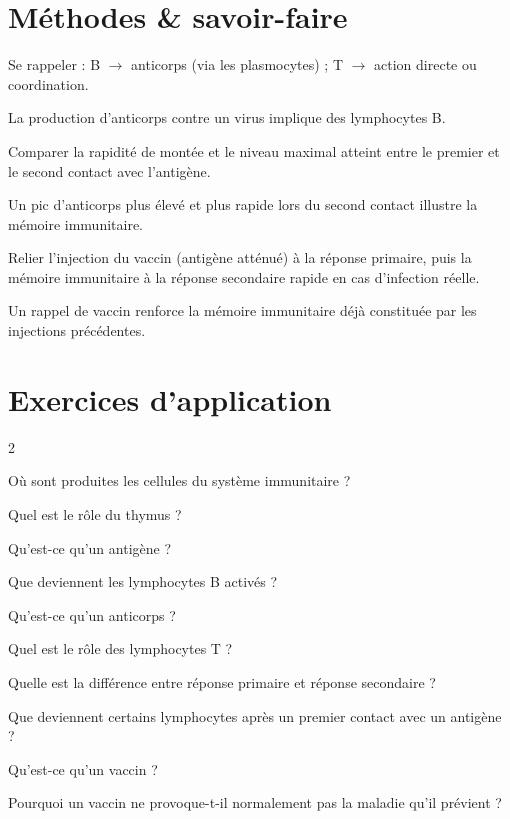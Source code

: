 \section{Méthodes \& savoir-faire}

Se rappeler : B $\to$ anticorps (via les plasmocytes) ; T $\to$ action directe ou
coordination.
\begin{exemple}
La production d'anticorps contre un virus implique des lymphocytes B.
\end{exemple}

Comparer la rapidité de montée et le niveau maximal atteint entre le premier et le second
contact avec l'antigène.
\begin{exemple}
Un pic d'anticorps plus élevé et plus rapide lors du second contact illustre la mémoire
immunitaire.
\end{exemple}

Relier l'injection du vaccin (antigène atténué) à la réponse primaire, puis la mémoire
immunitaire à la réponse secondaire rapide en cas d'infection réelle.
\begin{exemple}
Un rappel de vaccin renforce la mémoire immunitaire déjà constituée par les injections
précédentes.
\end{exemple}

\section{Exercices d'application}
\begin{multicols}{2}

\exo{} Où sont produites les cellules du système immunitaire ?

\exo{} Quel est le rôle du thymus ?

\exo{} Qu'est-ce qu'un antigène ?

\exo{} Que deviennent les lymphocytes B activés ?

\exo{} Qu'est-ce qu'un anticorps ?

\exo{} Quel est le rôle des lymphocytes T ?

\exo{} Quelle est la différence entre réponse primaire et réponse secondaire ?

\exo{} Que deviennent certains lymphocytes après un premier contact avec un
antigène ?

\exo{} Qu'est-ce qu'un vaccin ?

\exo{} Pourquoi un vaccin ne provoque-t-il normalement pas la maladie qu'il
prévient ?

\end{multicols}

